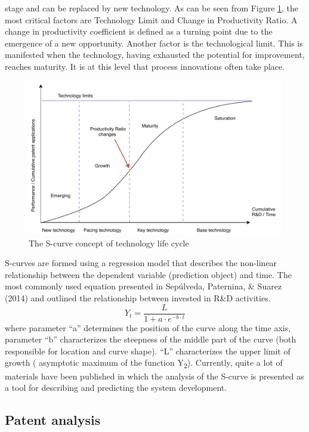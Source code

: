 \documentclass[12pt,twoside]{reedthesis}
\begin{document}
stage and can be replaced by new technology. As can be seen from Figure \ref{fig:scurve}, the most critical factors are Technology Limit and Change in Productivity Ratio. A change in productivity coefficient is defined as a turning point due to the emergence of a new opportunity. Another factor is the technological limit. This is manifested when the technology, having exhausted the potential for improvement, reaches maturity. It is at this level that process innovations often take place.
\begin{figure}[h]

{\centering \includegraphics[width=0.8\linewidth,]{figure/S_curve} 

}

\caption{The S-curve concept of technology life cycle}\label{fig:scurve}
\end{figure}
S-curves are formed using a regression model that describes the non-linear relationship between the dependent variable (prediction object) and time. The most commonly used equation presented in Sepúlveda, Paternina, \& Suarez (2014) and outlined the relationship between invested in R\&D activities.
\begin{equation} 
  Y_{t}=\frac{L}{1+a\cdot e^{-b\cdot t} }
\end{equation}
where parameter ``a'' determines the position of the curve along the time axis, parameter ``b'' characterizes the steepness of the middle part of the curve (both responsible for location and curve shape). ``L'' characterizes the upper limit of growth (
asymptotic maximum of the function Y\textsubscript{2}). Currently, quite a lot of materials have been published in which the analysis of the S-curve is presented as a tool for describing and predicting the system development.

\hypertarget{patent-analysis}{%
\subsection{Patent analysis}\label{patent-analysis}}
\end{document}
